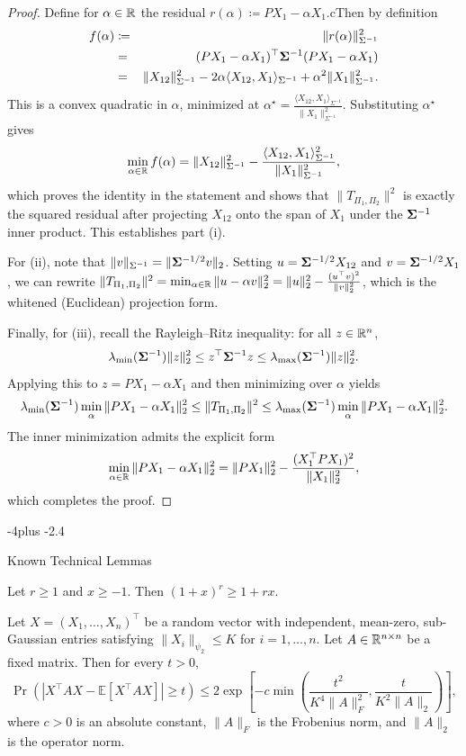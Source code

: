 \documentclass[numsec,webpdf,modern,medium,namedate]{oup-authoring-template}
\makeatletter
\theoremstyle{thmstyleone}%
\theoremstyle{thmstyletwo}%
\theoremstyle{thmstylethree}%
\def\subsection{%
  \@startsection{subsection}{2}{\z@}
  {-4\p@ plus -2\p@}{\if@traditional.4\p@\else2\p@\fi}
  {\reset@font\raggedright\subsecsize}}
\makeatother
\begin{document}
\begin{proof}
Define for $\alpha\in\mathbb{R}$ the residual $r(\alpha) \coloneqq PX_1 - \alpha X_1$.cThen by definition
\begin{eqnarray*}
f(\alpha) 
&\coloneqq& \|r(\alpha)\|_{\Sigma^{-1}}^2 \\
&=& (PX_1-\alpha X_1)^\top {\boldsymbol{\Sigma}}^{-1}(PX_1-\alpha X_1) \\
&=& \|X_{12}\|_{\Sigma^{-1}}^2 
   - 2\alpha \langle X_{12},X_1\rangle_{\Sigma^{-1}}
   + \alpha^2 \|X_1\|_{\Sigma^{-1}}^2.
\end{eqnarray*}
This is a convex quadratic in $\alpha$, minimized at
$\alpha^\star = \frac{\langle X_{12},X_1\rangle_{\Sigma^{-1}}}{\|X_1\|_{\Sigma^{-1}}^2}$. Substituting $\alpha^\star$ gives
$$
\min_{\alpha\in\mathbb{R}} f(\alpha)
= \|X_{12}\|_{\Sigma^{-1}}^2
- \frac{\langle X_{12},X_1\rangle_{\Sigma^{-1}}^2}{\|X_1\|_{\Sigma^{-1}}^2},
$$
which proves the identity in the statement and shows that 
$\|T_{\Pi_1,\Pi_2}\|^2$ is exactly the squared residual after projecting
$X_{12}$ onto the span of $X_1$ under the ${\boldsymbol{\Sigma}}^{-1}$ inner product. 
This establishes part (i).

For (ii), note that $\|v\|_{\Sigma^{-1}} = \|{\boldsymbol{\Sigma}}^{-1/2} v\|_2$. 
Setting $u = {\boldsymbol{\Sigma}}^{-1/2}X_{12}$ and $v = {\boldsymbol{\Sigma}}^{-1/2}X_1$,
we can rewrite $\|T_{\Pi_1,\Pi_2}\|^2
= \min_{\alpha\in\mathbb{R}}\|u - \alpha v\|_2^2
= \|u\|_2^2 - \frac{(u^\top v)^2}{\|v\|_2^2}$, which is the whitened (Euclidean) projection form.

Finally, for (iii), recall the Rayleigh--Ritz inequality: for all $z\in\mathbb{R}^n$,
$$
\lambda_{\min}({\boldsymbol{\Sigma}}^{-1})\|z\|_2^2
\leq z^\top {\boldsymbol{\Sigma}}^{-1} z
\leq \lambda_{\max}({\boldsymbol{\Sigma}}^{-1})\|z\|_2^2.
$$
Applying this to $z=PX_1-\alpha X_1$ and then minimizing over $\alpha$ yields
$$
\lambda_{\min}({\boldsymbol{\Sigma}}^{-1}) \min_{\alpha}\|PX_1-\alpha X_1\|_2^2
\leq \|T_{\Pi_1,\Pi_2}\|^2
\leq \lambda_{\max}({\boldsymbol{\Sigma}}^{-1}) \min_{\alpha}\|PX_1-\alpha X_1\|_2^2.
$$
The inner minimization admits the explicit form
$$
\min_{\alpha\in\mathbb{R}}\|PX_1-\alpha X_1\|_2^2
= \|PX_1\|_2^2 - \frac{(X_1^\top P X_1)^2}{\|X_1\|_2^2},
$$
which completes the proof.
\end{proof}

\subsection{Known Technical Lemmas}

\begin{lemma}\label{lem:bernoulli-ineq}
Let $r \ge 1$ and $x \ge -1$. Then $(1+x)^r \ge 1+rx$.
\end{lemma}
\begin{lemma}\label{lem:hanson-wright}
Let $X=(X_1,\dots,X_n)^\top$ be a random vector with independent, mean-zero, sub-Gaussian entries satisfying $\|X_i\|_{\psi_2} \leq K$ for $i=1,\dots,n.$ Let \(A\in\mathbb{R}^{n\times n}\) be a fixed matrix. Then for every $t>0$,
$$
\Pr\!\left(\left|X^\top A X-\mathbb{E}[X^\top A X]\right|\ge t\right)
\le
2\exp\left[
-c\min\left(
\frac{t^2}{K^4\|A\|_F^2},
\frac{t}{K^2\|A\|_2}
\right)
\right],
$$
where $c>0$ is an absolute constant, $\|A\|_F$ is the Frobenius norm, and $\|A\|_2$ is the operator norm.
\end{lemma}
\end{document}
